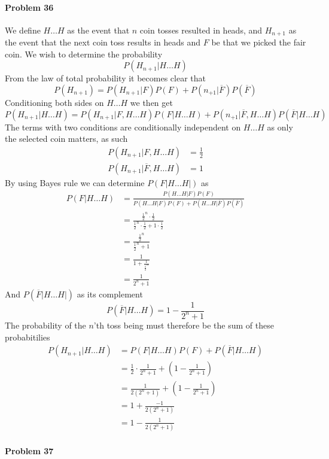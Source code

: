 \paragraph{Problem 36}
We define $H\ldots H$ as the event that $n$ coin tosses resulted in heads, and $H_{n+1}$ as the event that the next coin toss results in heads and $F$ be that we picked the fair coin. We wish to determine the probability
\[
    P(H_{n+1}|H\ldots H)
\]
From the law of total probability it becomes clear that
\[
    P(H_{n+1})=P(H_{n+1}|F)P(F)+P(n_{+1}|\overline{F})P(\overline{F})
\]
Conditioning both sides on $H\ldots H$ we then get
\[
    P(H_{n+1}|H\ldots H)=P(H_{n+1}|F,H\ldots H)P(F|H\ldots H)+P(n_{+1}|\overline{F},H\ldots H)P(\overline{F}|H\ldots H)
\]
The terms with two conditions are conditionally independent on $H\ldots H$ as only the selected coin matters, as such
\begin{align*}
    P(H_{n+1}|F,H\ldots H)&=\frac{1}{2} \\
    P(H_{n+1}|\overline{F},H\ldots H)&=1
\end{align*}
By using Bayes rule we can determine $P(F|H\ldots H|)$ as
\begin{align*}
    P(F|H\ldots H)&=\frac{P(H\ldots H|F)P(F)}{P(H\ldots H|F)P(F)+P(H\ldots H|\overline{F})P(\overline{F})} \\
             &=\frac{\frac{1}{2}^{n}\cdot \frac{1}{2}}{\frac{1}{2}^{n}\cdot\frac{1}{2}+1\cdot\frac{1}{2}} \\
             &=\frac{\frac{1}{2}^{n}}{\frac{1}{2}^{n}+1} \\
             &=\frac{1}{1+\frac{1}{\frac{1}{2}^{n}}} \\
             &=\frac{1}{2^{n}+1}
\end{align*}
And $P(\overline{F}|H\ldots H|)$ as its complement
\[
    P(\overline{F}|H\ldots H)=1-\frac{1}{2^{n}+1}
\]
The probability of the $n$'th toss being must therefore be the sum of these probabitilies
\begin{align*}
    P(H_{n+1}|H\ldots H)&=P(F|H\ldots H)P(F)+P(\overline{F}|H\ldots H) \\
                  &=\frac{1}{2}\cdot\frac{1}{2^{n}+1}+\left(1-\frac{1}{2^{n}+1}\right) \\
                  &=\frac{1}{2(2^{n}+1)}+\left(1-\frac{1}{2^{n}+1}\right) \\
                  &=1+\frac{-1}{2(2^{n}+1)} \\
                  &=1-\frac{1}{2(2^{n}+1)}
\end{align*}
\paragraph{Problem 37}
